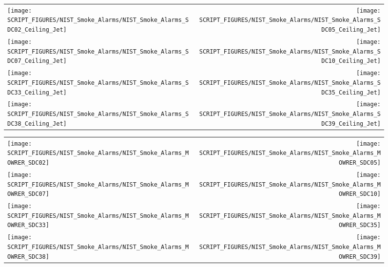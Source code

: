 \begin{figure}[p]
\begin{tabular*}{\textwidth}{l@{\extracolsep{\fill}}r}
\texttt{[image: SCRIPT\_FIGURES/NIST\_Smoke\_Alarms/NIST\_Smoke\_Alarms\_SDC02\_Ceiling\_Jet]} &
\texttt{[image: SCRIPT\_FIGURES/NIST\_Smoke\_Alarms/NIST\_Smoke\_Alarms\_SDC05\_Ceiling\_Jet]} \\
\texttt{[image: SCRIPT\_FIGURES/NIST\_Smoke\_Alarms/NIST\_Smoke\_Alarms\_SDC07\_Ceiling\_Jet]} &
\texttt{[image: SCRIPT\_FIGURES/NIST\_Smoke\_Alarms/NIST\_Smoke\_Alarms\_SDC10\_Ceiling\_Jet]} \\
\texttt{[image: SCRIPT\_FIGURES/NIST\_Smoke\_Alarms/NIST\_Smoke\_Alarms\_SDC33\_Ceiling\_Jet]} &
\texttt{[image: SCRIPT\_FIGURES/NIST\_Smoke\_Alarms/NIST\_Smoke\_Alarms\_SDC35\_Ceiling\_Jet]} \\
\texttt{[image: SCRIPT\_FIGURES/NIST\_Smoke\_Alarms/NIST\_Smoke\_Alarms\_SDC38\_Ceiling\_Jet]} &
\texttt{[image: SCRIPT\_FIGURES/NIST\_Smoke\_Alarms/NIST\_Smoke\_Alarms\_SDC39\_Ceiling\_Jet]}
\end{tabular*}
\end{figure}

\begin{figure}[p]
\begin{tabular*}{\textwidth}{l@{\extracolsep{\fill}}r}
\texttt{[image: SCRIPT\_FIGURES/NIST\_Smoke\_Alarms/NIST\_Smoke\_Alarms\_MOWRER\_SDC02]} &
\texttt{[image: SCRIPT\_FIGURES/NIST\_Smoke\_Alarms/NIST\_Smoke\_Alarms\_MOWRER\_SDC05]} \\
\texttt{[image: SCRIPT\_FIGURES/NIST\_Smoke\_Alarms/NIST\_Smoke\_Alarms\_MOWRER\_SDC07]} &
\texttt{[image: SCRIPT\_FIGURES/NIST\_Smoke\_Alarms/NIST\_Smoke\_Alarms\_MOWRER\_SDC10]} \\
\texttt{[image: SCRIPT\_FIGURES/NIST\_Smoke\_Alarms/NIST\_Smoke\_Alarms\_MOWRER\_SDC33]} &
\texttt{[image: SCRIPT\_FIGURES/NIST\_Smoke\_Alarms/NIST\_Smoke\_Alarms\_MOWRER\_SDC35]} \\
\texttt{[image: SCRIPT\_FIGURES/NIST\_Smoke\_Alarms/NIST\_Smoke\_Alarms\_MOWRER\_SDC38]} &
\texttt{[image: SCRIPT\_FIGURES/NIST\_Smoke\_Alarms/NIST\_Smoke\_Alarms\_MOWRER\_SDC39]}
\end{tabular*}
\end{figure}

